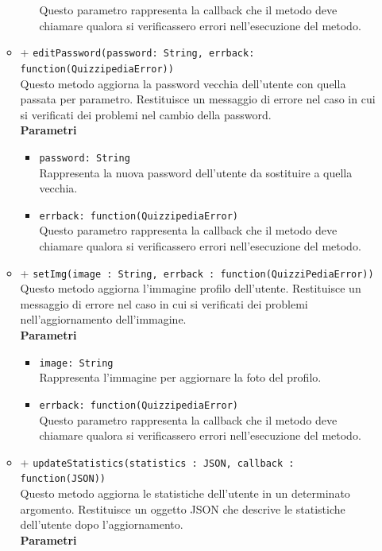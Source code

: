 \begin{itemize}
\begin{itemize}
\begin{itemize}
				Questo parametro rappresenta la callback che il metodo deve chiamare qualora si verificassero errori nell'esecuzione del metodo.
			\end{itemize}	
		\item	
		+ \texttt{editPassword(password: String, errback: function(QuizzipediaError))} \\
		Questo metodo aggiorna la password vecchia dell'utente con quella passata per parametro. Restituisce un messaggio di errore nel caso in cui si verificati dei problemi nel cambio della password.	\\
		\textbf{Parametri} 
			\begin{itemize}
			\item
				\texttt{password: String} \\
				Rappresenta la nuova password dell'utente da sostituire a quella vecchia.
			\item	
				\texttt{errback: function(QuizzipediaError)} \\
				Questo parametro rappresenta la callback che il metodo deve chiamare qualora si verificassero errori nell'esecuzione del metodo.
			\end{itemize}
		\item	
		+ \texttt{setImg(image : String, errback : function(QuizziPediaError))} \\	
		Questo metodo aggiorna l'immagine profilo dell'utente. Restituisce un messaggio di errore nel caso in cui si verificati dei problemi nell'aggiornamento dell'immagine.	\\	
		\textbf{Parametri} 
			\begin{itemize}
			\item
				\texttt{image: String} \\
				Rappresenta l'immagine per aggiornare la foto del profilo.
			\item	
				\texttt{errback: function(QuizzipediaError)} \\
				Questo parametro rappresenta la callback che il metodo deve chiamare qualora si verificassero errori nell'esecuzione del metodo.
			\end{itemize}
		\item	
		+ \texttt{updateStatistics(statistics : JSON, callback : function(JSON))} \\	
		Questo metodo aggiorna le statistiche dell'utente in un determinato argomento. Restituisce un oggetto JSON che descrive le statistiche dell'utente dopo l'aggiornamento.	\\	
		\textbf{Parametri} 
			\begin{itemize}

\end{itemize}
\end{itemize}
\end{itemize}

